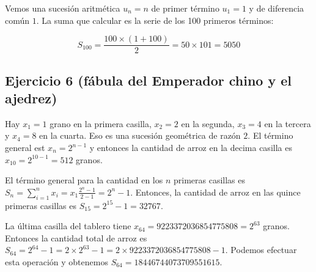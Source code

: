 Vemos una sucesión aritmética $u_n = n$ de primer término $u_1 = 1$ y de
diferencia común $1$. La suma que calcular es la serie de los 100 primeros
términos:

$$
S_{100} = \frac{{100} \times {(1+100)}}{2} = 50 \times 101 = 5050
$$

\subsection*{Ejercicio 6 (fábula del Emperador chino y el ajedrez)}

Hay $x_1=1$ grano en la primera casilla, $x_2=2$ en la segunda, $x_3=4$ en la
tercera y $x_4=8$ en la cuarta. Eso es una sucesión geométrica de razón $2$.
El término general est $x_n = 2^{n-1}$ y entonces la 
cantidad de arroz en la decima casilla es $x_{10} = 2^{10-1} = 512$ granos.

El término general para la cantidad en los $n$ primeras casillas es
$S_n = \sum_{i=1}^n x_i = x_1 \frac{2^n-1}{2-1} = 2^n - 1$. Entonces, 
la cantidad de arroz en las quince primeras casillas es
$S_{15}  = 2^{15} - 1 = 32767$.

La última casilla del tablero tiene
$x_{64} = 9223372036854775808 = 2^{63}$ granos. Entonces la cantidad total de
arroz es $S_{64} = 2^{64} - 1 = 2 \times 2^{63} - 1 =
2 \times 9223372036854775808 - 1$. Podemos efectuar esta operación y obtenemos
$S_{64} = 18446744073709551615$.
